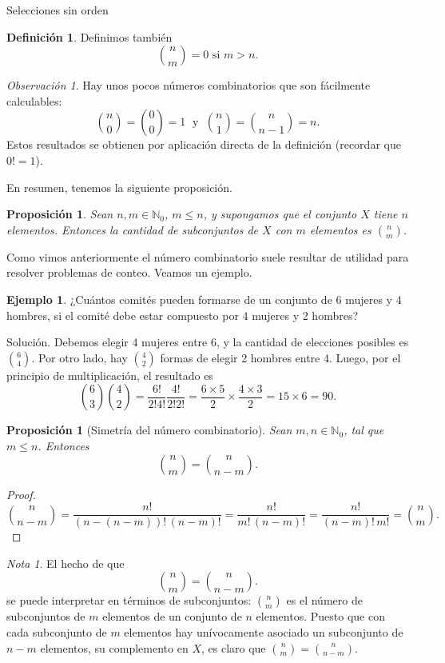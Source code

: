 \documentclass[11pt,spanish,makeidx]{amsbook}
\newtheorem{proposicion}[teorema]{Proposici\'on}
\theoremstyle{definition}
\newtheorem{definicion}{Definici\'on}[section]
\newtheorem{ejemplo}{Ejemplo}[section]
\theoremstyle{remark}
\newtheorem{observacion}{Observaci\'on}[section]
\newtheorem{nota}{Nota}[section]
\begin{document}
\begin{section}{Selecciones sin orden}
\begin{definicion}
Definimos también
$$
\binom{n}{m} = 0 \text{ si } m > n.
$$
\end{definicion}

\begin{observacion} Hay unos pocos números combinatorios que son fácilmente calculables: 
$$
\binom{n}{0} = \binom{0}{0} = 1 \;\text{ y }\;  \binom{n}{1} = \binom{n}{n-1} = n. 
$$
Estos resultados se obtienen por aplicación directa de la definición (recordar que  $0! =1$). 
\end{observacion}

En resumen, tenemos la siguiente proposición.

\begin{proposicion}
Sean $n, m \in \mathbb N_0$, $m \le n$, y supongamos que el conjunto $X$ tiene $n$ elementos. Entonces la cantidad de subconjuntos de $X$ con $m$ elementos es
$
\displaystyle\binom{n}{m}
$.
\end{proposicion}

Como vimos anteriormente el número combinatorio suele resultar de utilidad para resolver problemas de conteo. Veamos un ejemplo.

\begin{ejemplo}
 ¿Cuántos comités pueden formarse de un conjunto de 6 mujeres y 4 hombres, si el comité debe estar compuesto por 4 mujeres y 2 hombres?

{\sc Solución.} Debemos elegir 4 mujeres entre 6, y la cantidad de elecciones posibles es   $\binom{6}{4}$. Por otro lado, hay $ \binom{4}{2}$ formas de elegir 2 hombres entre 4. Luego, por el principio de multiplicación,  el resultado es
$$
\binom{6}{3}\binom{4}{2} = \frac{6!}{2!4!}\frac{4!}{2!2!} = \frac{6\times 5}{2}\times\frac{4\times 3}{2} = 15 \times 6 = 90.
$$
\end{ejemplo}

\begin{proposicion}[Simetría del número combinatorio]\label{simcomb}
Sean $m,n \in \mathbb N_0$, tal que $m \le n$. Entonces
$$
\binom{n}{m} = \binom{n}{n-m}.
$$
\end{proposicion}
\begin{proof}
$$
\binom{n}{n-m} = \frac{n!}{(n-(n-m))!\,(n-m)!} =  \frac{n!}{m!\,(n-m)!} =   \frac{n!}{(n-m)!\,m!} = \binom{n}{m}.
$$
\end{proof}

\begin{nota}
El hecho  de que 
$$
\binom{n}{m} = \binom{n}{n-m}.
$$
se puede interpretar en términos de subconjuntos:  $\displaystyle\binom{n}{m}$ es el número de subconjuntos de $m$ elementos de un conjunto de $n$ elementos. Puesto que con cada subconjunto de $m$ elementos hay unívocamente asociado un subconjunto de $n - m$ elementos, su complemento en $X$, es claro que $\displaystyle\binom{n}{m} = \binom{n}{n-m}$.
\end{nota}


\end{section}
\end{document}
